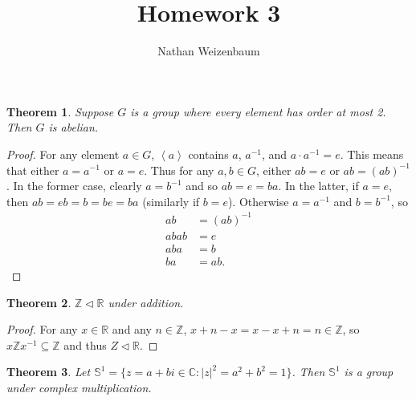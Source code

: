 \documentclass{amsart}
\title{Homework 3}
\author{Nathan Weizenbaum}
\newtheorem{thm}{Theorem}
\newcommand{\gen}[1]{\left<#1\right>}
\newcommand{\inv}{^{-1}}
\newcommand{\Z}{\mathbb{Z}}
\newcommand{\R}{\mathbb{R}}
\newcommand{\C}{\mathbb{C}}
\newcommand{\cg}{\mathbb{S}^1}
\newcommand{\nsubgrp}{\triangleleft}
\begin{document}
\maketitle

\begin{thm}
  Suppose $G$ is a group where every element has order at most 2.
  Then $G$ is abelian.
\end{thm}

\begin{proof}
  For any element $a \in G$, $\gen{a}$ contains $a$, $a\inv$, and $a \cdot a\inv = e$.
  This means that either $a = a\inv$ or $a = e$.
  Thus for any $a, b \in G$, either $ab = e$ or $ab = (ab)\inv$.
  In the former case, clearly $a = b\inv$ and so $ab = e = ba$.
  In the latter, if $a = e$, then $ab = eb = b = be = ba$ (similarly if $b = e$).
  Otherwise $a = a\inv$ and $b = b\inv$, so
  \begin{align*}
    ab &= (ab)\inv\\
    abab &= e\\
    aba &= b\\
    ba &= ab.
  \end{align*}
\end{proof}

\begin{thm}
  $\Z \nsubgrp \R$ under addition.
\end{thm}

\begin{proof}
  For any $x \in \R$ and any $n \in \Z$,
  $x + n - x = x - x + n = n \in \Z$,
  so $x\Z x\inv \subseteq \Z$ and thus $Z \nsubgrp \R$.
\end{proof}

\begin{thm}
  Let $\cg = \{z = a + bi \in \C : |z|^2 = a^2 + b^2 = 1\}$.
  Then $\cg$ is a group under complex multiplication.
\end{thm}
\end{document}
